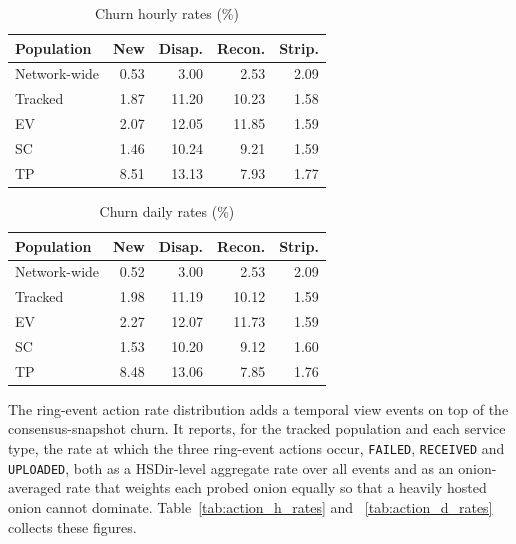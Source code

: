 \documentclass[conference]{IEEEtran}
\begin{document}
\begin{table}[htbp]
\caption{Churn hourly rates (\%)}
\begin{center}
\begin{tabular}{|l|r|r|r|r|}
\hline
\textbf{Population} & \textbf{New} & \textbf{Disap.} & \textbf{Recon.} & \textbf{Strip.} \\
\hline
Network-wide & 0.53 & 3.00 & 2.53 & 2.09 \\
\hline
Tracked & 1.87 & 11.20 & 10.23 & 1.58 \\
\hline
EV & 2.07 & 12.05 & 11.85 & 1.59 \\
\hline
SC & 1.46 & 10.24 & 9.21 & 1.59 \\
\hline
TP & 8.51 & 13.13 & 7.93 & 1.77 \\
\hline
\end{tabular}
\label{tab:churn_hourly}
\end{center}
\end{table}
 
\begin{table}[htbp]
\caption{Churn daily rates (\%)}
\begin{center}
\begin{tabular}{|l|r|r|r|r|}
\hline
\textbf{Population} & \textbf{New} & \textbf{Disap.} & \textbf{Recon.} & \textbf{Strip.} \\
\hline
Network-wide & 0.52 & 3.00 & 2.53 & 2.09 \\
\hline
Tracked & 1.98 & 11.19 & 10.12 & 1.59 \\
\hline
EV & 2.27 & 12.07 & 11.73 & 1.59 \\
\hline
SC & 1.53 & 10.20 & 9.12 & 1.60 \\
\hline
TP & 8.48 & 13.06 & 7.85 & 1.76 \\
\hline
\end{tabular}
\label{tab:churn_daily}
\end{center}
\end{table}
 
The ring-event action rate distribution adds a temporal view events on top of the consensus-snapshot churn. It reports, for the tracked population 
and each service type, the rate at which the three ring-event actions occur, \texttt{FAILED}, \texttt{RECEIVED} and \texttt{UPLOADED}, both as a 
HSDir-level aggregate rate over all events and as an onion-averaged rate that weights each probed onion equally so that a heavily hosted onion 
cannot dominate. Table~\ref{tab:action_h_rates} and ~\ref{tab:action_d_rates} collects these figures.
 
\end{document}
